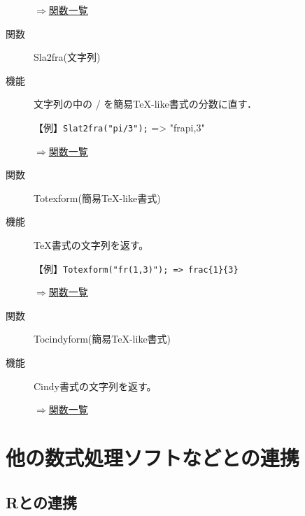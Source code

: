 \documentclass[papersize,a4paper,12pt,uplatex]{jsarticle}
\begin{document}
\begin{description}
\begin{flushright}\hyperlink{functionlist}{$\Rightarrow$関数一覧}\end{flushright}

\vspace{\baselineskip}

\hypertarget{sla2fra}{}
\item[関数]Sla2fra(文字列)
\item[機能]文字列の中の / を簡易TeX-like書式の分数に直す．

\vspace{\baselineskip}

【例】\verb|Slat2fra("pi/3");| => "fra{pi,3}" 

\begin{flushright}\hyperlink{functionlist}{$\Rightarrow$関数一覧}\end{flushright}

\vspace{\baselineskip}
\hypertarget{totexform}{}
\item[関数]Totexform(簡易TeX-like書式)
\item[機能]TeX書式の文字列を返す。

\vspace{\baselineskip}
【例】\verb|Totexform("fr(1,3)"); => frac{1}{3}|

\begin{flushright}\hyperlink{functionlist}{$\Rightarrow$関数一覧}\end{flushright}

\vspace{\baselineskip}
\hypertarget{tocindyform}{}
\item[関数]Tocindyform(簡易TeX-like書式)
\item[機能]Cindy書式の文字列を返す。

\begin{flushright}\hyperlink{functionlist}{$\Rightarrow$関数一覧}\end{flushright}

\end{description}
\newpage

\section{他の数式処理ソフトなどとの連携}
\subsection{Rとの連携}
\end{document}
